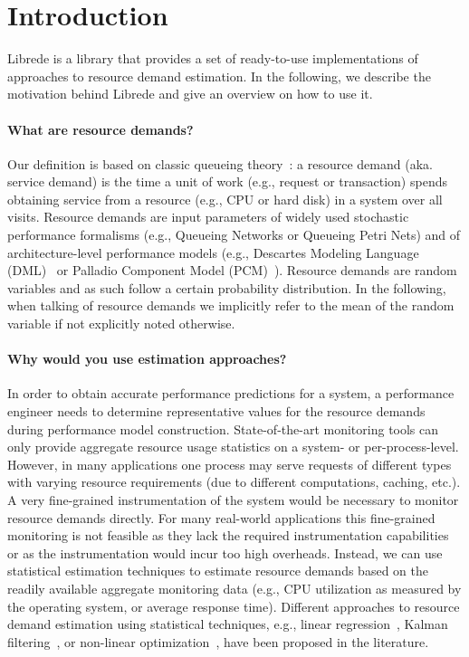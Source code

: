 \section{Introduction}

Librede is a library that provides a set of ready-to-use implementations of approaches to resource demand estimation. In the following, we describe the motivation behind Librede and give an overview on how to use it.

\paragraph{What are resource demands?}
Our definition is based on classic queueing theory~\cite{Lazowska_Zahorjan_Graham_Sevcik_1984}: a resource demand (aka. service demand) is the time a unit of work (e.g., request or transaction) spends obtaining service from a resource (e.g., CPU or hard disk) in a system over all visits. Resource demands are input parameters of widely used stochastic performance formalisms (e.g., Queueing Networks or Queueing Petri Nets) and of architecture-level performance models (e.g., Descartes Modeling Language (DML)~\cite{DML_report_2014} or Palladio Component Model (PCM)~\cite{becker2008a}). Resource demands are random variables and as such follow a certain probability distribution. In the following, when talking of resource demands we implicitly refer to the mean of the random variable if not explicitly noted otherwise.

\paragraph{Why would you use estimation approaches?}
In order to obtain accurate performance predictions for a system, a performance engineer needs to determine representative values for the resource demands during performance model construction. State-of-the-art monitoring tools can only provide aggregate resource usage statistics on a system- or per-process-level. However, in many applications one process may serve requests of different types with varying resource requirements (due to different computations, caching, etc.). A very fine-grained instrumentation of the system would be necessary to monitor resource demands directly. For many real-world applications this fine-grained monitoring is not feasible as they lack the required instrumentation capabilities or as the instrumentation would incur too high overheads. Instead, we can use statistical estimation techniques to estimate resource demands based on the readily available aggregate monitoring data (e.g., CPU utilization as measured by the operating system, or average response time). Different approaches to resource demand estimation using statistical techniques, e.g., linear regression~\cite{Rolia_Vetland_1995}, Kalman filtering~\cite{Zheng_Woodside_Litoiu_2008,Wang_Huang_Qin_Zhang_Wei_Zhong_2012}, or non-linear optimization~\cite{Menasce_2008,Liu_Wynter_Xia_Zhang_2006}, have been proposed in the literature.

